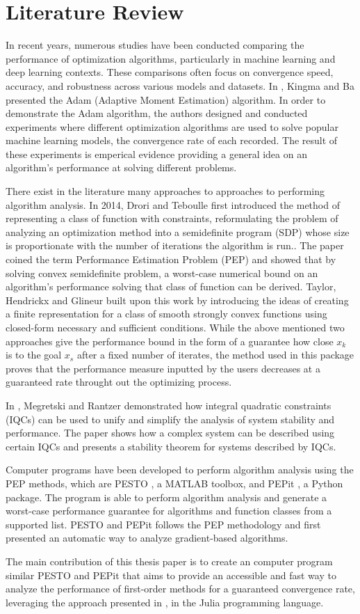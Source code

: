  \chapter{Literature Review}

In recent years, numerous studies have been conducted comparing the performance of optimization algorithms, particularly in machine learning and deep learning contexts. These comparisons often focus on convergence speed, accuracy, and robustness across various models and datasets. In \cite{adam}, Kingma and Ba presented the Adam (Adaptive Moment Estimation) algorithm. In order to demonstrate the Adam algorithm, the authors designed and conducted experiments where different optimization algorithms are used to solve popular machine learning models, the convergence rate of each recorded. The result of these experiments is emperical evidence providing a general idea on an algorithm's performance at solving different problems.

There exist in the literature many approaches to approaches to performing algorithm analysis. In 2014, Drori and Teboulle first introduced the method of representing a class of function with constraints, reformulating the problem of analyzing an optimization method into a semidefinite program (SDP) whose size is proportionate with the number of iterations the algorithm is run.\cite{drori2012}. The paper coined the term Performance Estimation Problem (PEP) and showed that by solving convex semidefinite problem, a worst-case numerical bound on an algorithm's performance solving that class of function can be derived. Taylor, Hendrickx and Glineur built upon this work by introducing the ideas of creating a finite representation for a class of smooth strongly convex functions using closed-form necessary and sufficient conditions. While the above mentioned two approaches give the performance bound in the form of a guarantee how close \(x_k\) is to the goal \(x_s\) after a fixed number of iterates, the method used in this package proves that the performance measure inputted by the users decreases at a guaranteed rate throught out the optimizing process.

In \cite{iqc}, Megretski and Rantzer demonstrated how integral quadratic constraints (IQCs) can be used to unify and simplify the analysis of system stability and performance. The paper shows how a complex system can be described using certain IQCs and presents a stability theorem for systems described by IQCs.

Computer programs have been developed to perform algorithm analysis using the PEP methods, which are PESTO \cite{pesto}, a MATLAB toolbox, and PEPit \cite{pepit}, a Python package. The program is able to perform algorithm analysis and generate a worst-case performance guarantee for algorithms and function classes from a supported list. PESTO and PEPit follows the PEP methodology and first presented an automatic way to analyze gradient-based algorithms.

The main contribution of this thesis paper is to create an computer program similar PESTO and PEPit that aims to provide an accessible and fast way to analyze the performance of first-order methods for a guaranteed convergence rate, leveraging the approach presented in \cite{tutorial}, in the Julia programming language.